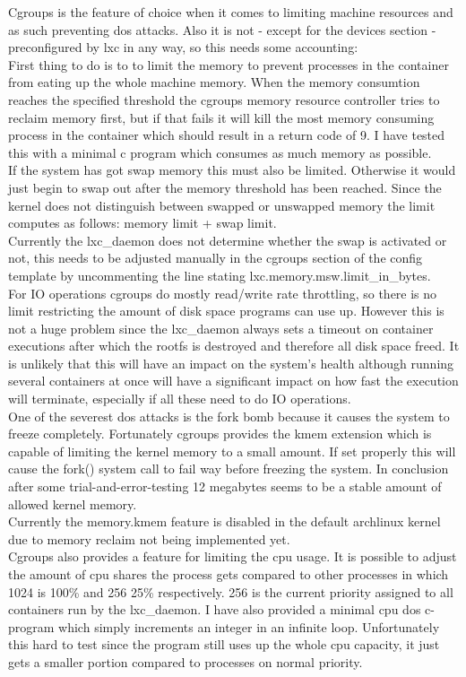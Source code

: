 Cgroups is the feature of choice when it comes to limiting machine resources and as such preventing dos attacks.
Also it is not - except for the devices section - preconfigured by lxc in any way, so this needs some accounting:\\
First thing to do is to to limit the memory to prevent processes in the container from eating up the whole machine memory.
When the memory consumtion reaches the specified threshold the cgroups memory resource controller tries to reclaim memory first,
but if that fails it will kill the most memory consuming process in the container which should result in a return code of 9\cite{cgrpmem}.
I have tested this with a minimal c program which consumes as much memory as possible.\\
If the system has got swap memory this must also be limited. Otherwise it would just begin to swap out after the memory
threshold has been reached. Since the kernel does not distinguish between swapped or unswapped memory the limit computes as follows:
memory limit + swap limit.\\
Currently the lxc\_daemon does not determine whether the swap is activated or not, this needs to be adjusted manually in the cgroups
section of the config template by uncommenting the line stating lxc.memory.msw.limit\_in\_bytes.\\
For IO operations cgroups do mostly read/write rate throttling, so there is no limit restricting the amount of disk space programs
can use up. However this is not a huge problem since the lxc\_daemon always sets a timeout on container executions after which the
rootfs is destroyed and therefore all disk space freed. It is unlikely that this will have an impact on the system's health although
running several containers at once will have a significant impact on how fast the execution will terminate, especially if all these
need to do IO operations.\\
One of the severest dos attacks is the fork bomb because it causes the system to freeze completely\cite{forkbomb}. Fortunately cgroups provides
the kmem extension which is capable of limiting the kernel memory to a small amount. If set properly this will cause the fork()
system call to fail way before freezing the system. In conclusion after some trial-and-error-testing 12 megabytes seems to be a
stable amount of allowed kernel memory.\\
Currently the memory.kmem feature is disabled in the default archlinux kernel due to memory reclaim not being implemented yet\cite{kmembug}.\\
Cgroups also provides a feature for limiting the cpu usage. It is possible to adjust the amount of cpu shares the process gets compared to
other processes in which 1024 is 100\% and 256 25\% respectively. 256 is the current priority assigned to all containers run by the lxc\_daemon.
I have also provided a minimal cpu dos c-program which simply increments an integer in an infinite loop. Unfortunately this hard to test
since the program still uses up the whole cpu capacity, it just gets a smaller portion compared to processes on normal priority.

